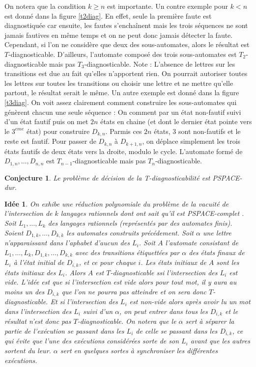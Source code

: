 \documentclass[conference]{IEEEtran}
\newtheorem{myconj}{Conjecture}
\newtheorem{myid}{Idée}
\begin{document}
On notera que la condition $k\ge n$ est importante. Un contre exemple pour $k<n$ est donné dans la figure \ref{t2diag}. En effet, seule la première faute est diagnostiquée car ensuite, les fautes s'enchaînent mais les trois séquences ne sont jamais fautives en même temps et on ne peut donc jamais détecter la faute. Cependant, si l'on ne considère que deux des sous-automates, alors le résultat est $T$-diagnosticable. D'ailleurs, l'automate composé des trois sous-automates est $T_2$-diagnosticable mais pas $T_3$-diagnosticable. Note : L'absence de lettres sur les transitions est due au fait qu'elles n'apportent rien. On pourrait autoriser toutes les lettres sur toutes les transitions ou choisir une lettre et ne mettre qu'elle partout, le résultat serait le même. Un autre exemple est donné dans la figure \ref{t3diag}. On voit assez clairement comment construire les sous-automates qui génèrent chacun une seule séquence : On comment par un état non-fautif suivi d'un état fautif puis on met $2n$ états en chaine (et dont le dernier état pointe vers le $3^{eme}$ état) pour construire $D_{k,n}$. Parmis ces $2n$ états, $3$ sont non-fautifs et le reste est fautif. Pour passer de $D_{k,n}$ à $D_{k+1,n}$, on déplace simplement les trois états fautifs de deux états vers la droite, modulo le cycle. L'automate formé de $D_{1,n},\dots,D_{n,n}$ est $T_{n-1}$-diagnosticable mais pas $T_n$-diagnosticable.

\begin{myconj}
Le problème de décision de la T-diagnosticabilité est PSPACE-dur.
\end{myconj}

\begin{myid}
On exhibe une réduction polynomiale du problème de la vacuité de l'intersection de $k$ langages rationnels dont ont sait qu'il est PSPACE-complet \cite{Lange92theemptiness}. Soit $L_1, \dots, L_k$ des langages rationnels (représentés par des automates finis). Soient $D_{1,k},\dots, D_{k,k}$ les automates construits précédement. Soit $\alpha$ une lettre n'apparaissant dans l'aphabet d'aucun des $L_i$. Soit $A$ l'automate consistant de $L_1, \dots, L_k, D_{1,k},\dots, D_{k,k}$ avec des transitions étiquettées par $\alpha$ des états finaux de $L_i$ à l'état initial de $D_{i,k}$, et ce pour chaque $i$. Les états initiaux de $A$ sont les états initiaux des $L_i$. Alors $A$ est $T$-diagnosticable ssi l'intersection des $L_i$ est vide. L'idée est que si l'intersection est vide alors pour tout mot, il y aura au moins un des $D_{i,k}$ que l'on ne pourra pas atteindre et on sera donc $T$-diagnosticable. Et si l'intersection des $L_i$ est non-vide alors après avoir lu un mot dans l'intersection des $L_i$ suivi d'un $\alpha$, on peut entrer dans tous les $D_{i,k}$ et le résultat n'est donc pas $T$-diagnosticable. On notera que le $\alpha$ sert à séparer la partie de l'exécution se passant dans les $L_i$ de celle se passant dans les $D_{i,k}$, ce qui évite que l'une des exécutions considérées sorte de son $L_i$ avant que les autres sortent du leur. $\alpha$ sert en quelques sortes à synchroniser les différentes exécutions.
\end{myid}
\end{document}

